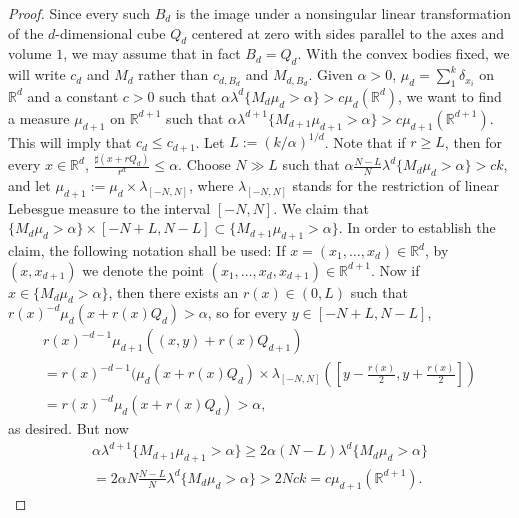 \documentclass[12pt,a4paper]{amsart}
\theoremstyle{plain}
\theoremstyle{remark}
\begin{document}
\begin{proof}
Since every such $B_d$ is the image under a nonsingular
linear transformation of the $d$-dimensional cube $Q_d$ centered at zero
with sides parallel to the axes and
volume $1$, we may assume that in fact $B_d = Q_d$.
With the convex bodies fixed, we will write
$c_d$ and $M_d$ rather than $c_{d,B_d}$ and $M_{d,B_d}$. Given $\alpha > 0$,
$\mu_d = \sum_1^k \delta_{x_i}$ on $\mathbb{R}^d$
and a constant $c > 0$ such that
$\alpha \lambda^d\{ M_d \mu_d > \alpha \} > c \mu_d (\mathbb{R}^d)$, we want to
find a measure $\mu_{d+1}$ on $\mathbb{R}^{d+1}$ such that
$\alpha \lambda ^{d+1}\{ M_{d+1} \mu_{d+1} > \alpha \} >
c \mu_{d+1} (\mathbb{R}^{d+1})$. This will imply that $c_d\le c_{d+1}$.
Let $L := (k/\alpha)^{1/d}$. Note that if $r \ge L$, then for every
$x\in \mathbb{R}^d$,
$\frac{\sharp (x + rQ_d) }{r^d} \le \alpha$. Choose $N \gg L$
such that $\alpha \frac{N-L}{N} \lambda^d \{ M_d \mu_d > \alpha \} > c k$,
and let $\mu_{d+1} := \mu_d \times \lambda_{[-N,N]}$, where
$\lambda_{[-N,N]}$ stands for the restriction of linear Lebesgue measure
to the interval $[-N, N]$. We claim that
$\{ M_d \mu_d > \alpha \} \times [-N+L, N-L] \subset
\{ M_{d+1} \mu_{d+1} > \alpha \}$. In order to establish the
claim, the following notation shall be used:
If $x = (x_1, \dots , x_d) \in \mathbb{R}^d$,
by $(x, x_{d+1})$ we denote the point
$(x_1, \dots , x_d, x_{d+1}) \in \mathbb{R}^{d+1}$. Now if
$x\in \{ M_d \mu_d > \alpha \}$, then there exists an $r(x)\in (0, L)$
such that $r(x)^{-d} \mu_d (x + r(x) Q_d) > \alpha$, so for every
$y\in [-N + L, N -L]$,
\begin{gather*}
    r(x)^{-d-1} \mu_{d+1} ((x, y) + r(x) Q_{d+1})
\\
    = r(x)^{-d-1} (\mu_d (x + r(x) Q_d)
      \times \lambda_{[-N,N]}( [y - \tfrac{r(x)}2, y + \tfrac{r(x)}2] )
\\
    = r(x)^{-d} \mu_d (x + r(x) Q_d)> \alpha,
\end{gather*}
as desired. But now
\begin{gather*}
    \alpha \lambda^{d+1} \{ M_{d+1} \mu_{d+1} > \alpha \}
    \ge 2 \alpha (N-L) \lambda^d \{ M_d \mu_d > \alpha \}
\\
    = 2 \alpha N \frac{N-L}{N} \lambda^d \{ M_d \mu_d > \alpha \}
       > 2 N c k = c \mu_{d+1} (\mathbb{R}^{d+1}).
\end{gather*}
\end{proof}
\end{document}
